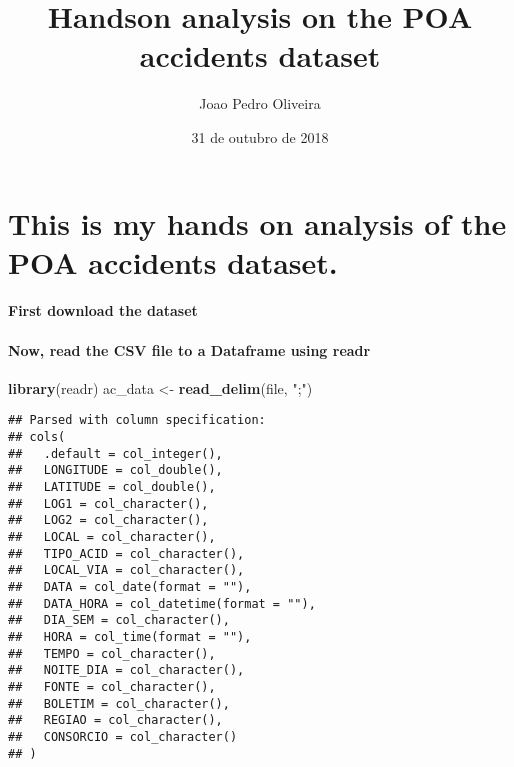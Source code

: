 \documentclass[]{article}
\title{Handson analysis on the POA accidents dataset}
\author{Joao Pedro Oliveira}
\date{31 de outubro de 2018}
\newenvironment{Shaded}{\begin{snugshade}}{\end{snugshade}}
\newcommand{\KeywordTok}[1]{\textcolor[rgb]{0.13,0.29,0.53}{\textbf{#1}}}
\newcommand{\DataTypeTok}[1]{\textcolor[rgb]{0.13,0.29,0.53}{#1}}
\newcommand{\StringTok}[1]{\textcolor[rgb]{0.31,0.60,0.02}{#1}}
\newcommand{\ControlFlowTok}[1]{\textcolor[rgb]{0.13,0.29,0.53}{\textbf{#1}}}
\newcommand{\OperatorTok}[1]{\textcolor[rgb]{0.81,0.36,0.00}{\textbf{#1}}}
\newcommand{\NormalTok}[1]{#1}
\let\oldparagraph\paragraph
\renewcommand{\paragraph}[1]{\oldparagraph{#1}\mbox{}}
\begin{document}
\maketitle

\section{This is my hands on analysis of the POA accidents
dataset.}\label{this-is-my-hands-on-analysis-of-the-poa-accidents-dataset.}

\paragraph{First download the dataset}\label{first-download-the-dataset}

\begin{Shaded}
\end{Shaded}

\paragraph{Now, read the CSV file to a Dataframe using
readr}\label{now-read-the-csv-file-to-a-dataframe-using-readr}

\begin{Shaded}
\begin{Highlighting}[]
\KeywordTok{library}\NormalTok{(readr)}
\NormalTok{ac_data <-}\StringTok{ }\KeywordTok{read_delim}\NormalTok{(file, }\StringTok{";"}\NormalTok{)}
\end{Highlighting}
\end{Shaded}

\begin{verbatim}
## Parsed with column specification:
## cols(
##   .default = col_integer(),
##   LONGITUDE = col_double(),
##   LATITUDE = col_double(),
##   LOG1 = col_character(),
##   LOG2 = col_character(),
##   LOCAL = col_character(),
##   TIPO_ACID = col_character(),
##   LOCAL_VIA = col_character(),
##   DATA = col_date(format = ""),
##   DATA_HORA = col_datetime(format = ""),
##   DIA_SEM = col_character(),
##   HORA = col_time(format = ""),
##   TEMPO = col_character(),
##   NOITE_DIA = col_character(),
##   FONTE = col_character(),
##   BOLETIM = col_character(),
##   REGIAO = col_character(),
##   CONSORCIO = col_character()
## )
\end{verbatim}
\end{document}

